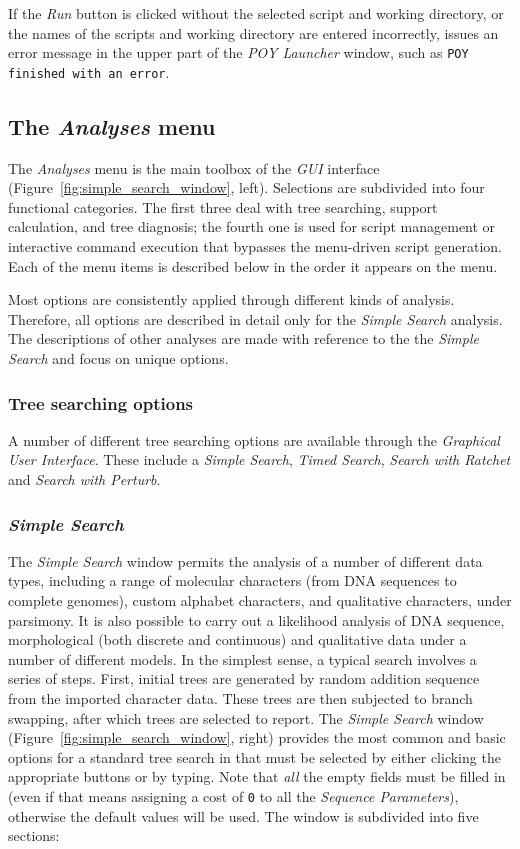 If the \emph{Run} button is clicked without the selected script and
working directory, or the names of the scripts and working directory are entered incorrectly, \poy issues an
error message in the upper part of the \emph{POY Launcher} window,
such as \texttt{POY finished with an error}.

\subsection{The \emph{Analyses} menu}
The \emph{Analyses} menu is the main toolbox of the \poy \emph{GUI} interface (Figure~\ref{fig:simple_search_window}, left). 
Selections are subdivided into four functional categories. The first three deal with tree searching, support calculation, 
and tree diagnosis; the fourth one is used for  script management or interactive command execution that bypasses the 
menu-driven script generation. Each of the menu items is described below in the order it appears on the menu.

Most options are consistently applied through different kinds of analysis. Therefore, all options are described in detail 
only for the \emph{Simple Search} analysis. The descriptions of other analyses are made with reference to the the 
\emph{Simple Search} and focus on unique options.


\subsubsection{Tree searching options}

A number of different tree searching options are available through the \emph{Graphical User Interface}.  
These include a \emph{Simple Search}, \emph{Timed Search}, \emph{Search with Ratchet} and 
\emph{Search with Perturb}. 

\subsubsection*{\emph{Simple Search}}
The \emph{Simple Search} window permits the analysis of a number of different data types, 
including a range of molecular characters (from DNA sequences to complete genomes), custom alphabet 
characters, and qualitative characters, under parsimony.  It is also possible to carry out a likelihood 
analysis of DNA sequence, morphological (both discrete and continuous) and qualitative data 
under a number of different models.  In the simplest sense, a typical search involves a series of steps. 
First, initial trees are generated by random addition sequence from the imported character data. 
These trees are then subjected to branch swapping, after which trees are selected to report. 
The \emph{Simple Search} window (Figure~\ref{fig:simple_search_window}, right) 
provides the most common and basic options for a standard tree search in \poy that must be selected 
by either clicking the appropriate buttons or by typing. Note that \emph{all} the empty fields must 
be filled in (even if that means assigning a cost of \texttt{0} to all the \emph{Sequence Parameters}), 
otherwise the default values will be used. The window is subdivided into five sections: 

